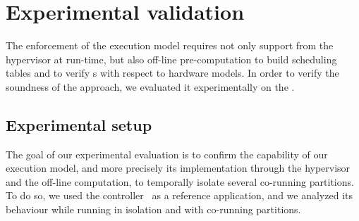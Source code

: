 \documentclass[main.tex]{subfiles}
\begin{document}
\section{Experimental validation} The enforcement of the execution model
requires not only support from the hypervisor at run-time, but also off-line
pre-computation to build scheduling tables and to verify \PC{}s with respect to
hardware models. In order to verify the soundness of the approach, we evaluated
it experimentally on the \mppalong.

\subsection{Experimental setup} The goal of our experimental evaluation is to
confirm the capability of our execution model, and more precisely its
implementation through the hypervisor and the off-line computation, to
temporally isolate several co-running partitions. To do so, we used the \rosace
controller~\cite{Pagetti2014} as a reference application, and we analyzed its
behaviour while running in isolation and with co-running partitions.
\end{document}
